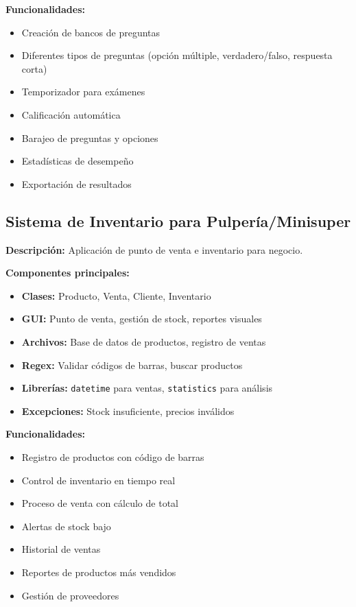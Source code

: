 \documentclass[12pt,a4paper]{article}
\begin{document}
\vspace{0.5em}
\textbf{Funcionalidades:}
\begin{itemize}
    \item Creación de bancos de preguntas
    \item Diferentes tipos de preguntas (opción múltiple, verdadero/falso, respuesta corta)
    \item Temporizador para exámenes
    \item Calificación automática
    \item Barajeo de preguntas y opciones
    \item Estadísticas de desempeño
    \item Exportación de resultados
\end{itemize}

\subsection{Sistema de Inventario para Pulpería/Minisuper}

\textbf{Descripción:} Aplicación de punto de venta e inventario para negocio.

\vspace{0.5em}
\textbf{Componentes principales:}
\begin{itemize}
    \item \textbf{Clases:} Producto, Venta, Cliente, Inventario
    \item \textbf{GUI:} Punto de venta, gestión de stock, reportes visuales
    \item \textbf{Archivos:} Base de datos de productos, registro de ventas
    \item \textbf{Regex:} Validar códigos de barras, buscar productos
    \item \textbf{Librerías:} \texttt{datetime} para ventas, \texttt{statistics} para análisis
    \item \textbf{Excepciones:} Stock insuficiente, precios inválidos
\end{itemize}

\vspace{0.5em}
\textbf{Funcionalidades:}
\begin{itemize}
    \item Registro de productos con código de barras
    \item Control de inventario en tiempo real
    \item Proceso de venta con cálculo de total
    \item Alertas de stock bajo
    \item Historial de ventas
    \item Reportes de productos más vendidos
    \item Gestión de proveedores
\end{itemize}
\end{document}

